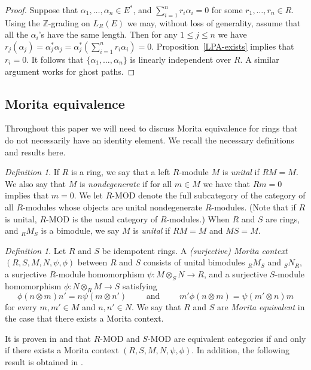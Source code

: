 \documentclass[11pt]{amsart}
\theoremstyle{remark}
\newtheorem{definition}[theorem]{Definition}
\numberwithin{equation}{section}
\newcommand{\Z}{\mathbb{Z}}
\begin{document}
\begin{proof}
Suppose that $\alpha_1, \ldots, \alpha_n \in E^*$, and $\sum_{i=1}^n r_i \alpha_i = 0$ for some $r_1, \ldots, r_n \in R$.  Using the $\Z$-grading on $L_R(E)$ we may, without loss of generality, assume that all the $\alpha_i$'s have the same length.  Then for any $1 \leq j \leq n$ we have $r_j (\alpha_j) = \alpha_j^* \alpha_j = \alpha_j^* ( \sum_{i=1}^n r_i \alpha_i) = 0$.  Proposition~\ref{LPA-exists} implies that $r_i = 0$.  It follows that  $\{ \alpha_1, \ldots, \alpha_n \}$ is linearly independent over $R$.  A similar argument works for ghost paths.
\end{proof}


\subsection{Morita equivalence}

Throughout this paper we will need to discuss Morita equivalence for rings that do not necessarily have an identity element.  We recall the necessary definitions and results here.

\begin{definition}
If $R$ is a ring, we say that a left $R$-module $M$ is \emph{unital} if $RM = M$.  We also say that $M$ is \emph{nondegenerate} if for all $m \in M$ we have that $Rm = 0$ implies that $m = 0$.  We let $R$-MOD denote the full subcategory of the category of all $R$-modules whose objects are unital nondegenerate $R$-modules.  (Note that if $R$ is unital, $R$-MOD is the usual category of $R$-modules.)  When $R$ and $S$ are rings, and ${}_RM_S$ is a bimodule, we say $M$ is \emph{unital} if $RM = M$ and $MS=M$.
\end{definition}

\begin{definition}
Let $R$ and $S$ be idempotent rings.  A \emph{(surjective) Morita context} $(R,S,M,N,\psi, \phi)$ between $R$ and $S$ consists of unital bimodules ${}_RM_S$ and ${}_SN_R$, a surjective $R$-module homomorphism $\psi : M \otimes_S N \to R$, and a surjective $S$-module homomorphism $\phi : N \otimes_R M \to S$ satisfying
$$\phi (n \otimes m) n' = n \psi (m \otimes n') \qquad \text{ and } \qquad m' \phi(n \otimes m) = \psi (m' \otimes n)m $$ for every $m, m' \in M$ and $n,n' \in N$.  We say that $R$ and $S$ are \emph{Morita equivalent} in the case that there exists a Morita context.
\end{definition}

It is proven in \cite[Proposition~2.5]{GS} and \cite[Proposition~2.7]{GS} that $R$-MOD and $S$-MOD are equivalent categories if and only if there exists a Morita context $(R,S,M,N,\psi, \phi)$.  In addition, the following result is obtained in \cite{GS}. 
\end{document}
